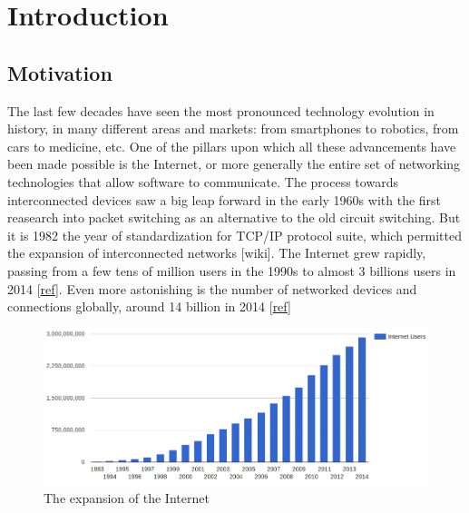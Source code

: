 \chapter{Introduction}
\label{chap:introduction}

\section{Motivation}
The last few decades have seen the most pronounced technology evolution in history, in many different areas and markets: from smartphones to robotics, from cars to medicine, etc. One of the pillars upon which all these advancements have been made possible is the Internet, or more generally the entire set of networking technologies that allow software to communicate. The process towards interconnected devices saw a big leap forward in the early 1960s with the first reasearch into packet switching as an alternative to the old circuit switching. But it is 1982 the year of standardization for TCP/IP protocol suite, which permitted the expansion of interconnected networks  [wiki]. The Internet grew rapidly, passing from a few tens of million users in the 1990s to almost 3 billions users in 2014 [\href{http://www.internetlivestats.com/internet-users}{ref}]. Even more astonishing is the number of networked devices and connections globally, around 14 billion in 2014 [\href{http://www.cisco.com/c/en/us/solutions/service-provider/visual-networking-index-vni/index.html#~complete-forecast}{ref}]

\begin{figure}[!htb]
\centering
\includegraphics[width=\textwidth]{images/internet_growth}
\caption{The expansion of the Internet}
\label{fig:networkscenario}
\end{figure}

